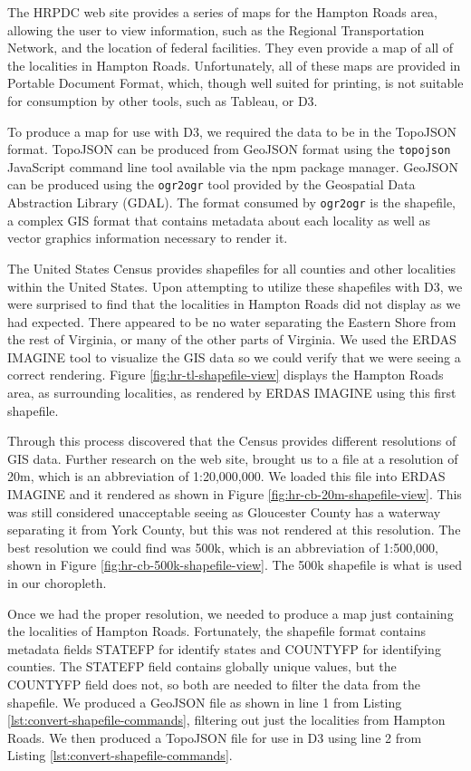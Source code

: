 \documentclass[10pt,journal,compsoc]{IEEEtran}
\begin{document}
The HRPDC web site provides a series of maps for the Hampton Roads area, allowing the user to view information, such as the Regional Transportation Network, and the location of federal facilities.  They even provide a map of all of the localities in Hampton Roads.  Unfortunately, all of these maps are provided in Portable Document Format, which, though well suited for printing, is not suitable for consumption by other tools, such as Tableau, or D3.

To produce a map for use with D3, we required the data to be in the TopoJSON format.  TopoJSON can be produced from GeoJSON format using the {\tt topojson} JavaScript command line tool available via the npm package manager.  GeoJSON can be produced using the {\tt ogr2ogr} tool provided by the Geospatial Data Abstraction Library (GDAL).  The format consumed by {\tt ogr2ogr} is the shapefile, a complex GIS format that contains metadata about each locality as well as vector graphics information necessary to render it.

The United States Census provides shapefiles for all counties and other localities within the United States.  Upon attempting to utilize these shapefiles with D3, we were surprised to find that the localities in Hampton Roads did not display as we had expected.  There appeared to be no water separating the Eastern Shore from the rest of Virginia, or many of the other parts of Virginia.  We used the ERDAS IMAGINE tool to visualize the GIS data so we could verify that we were seeing a correct rendering.  Figure \ref{fig:hr-tl-shapefile-view} displays the Hampton Roads area, as surrounding localities, as rendered by ERDAS IMAGINE using this first shapefile.

Through this process discovered that the Census provides different resolutions of GIS data.  Further research on the web site, brought us to a file at a resolution of 20m, which is an abbreviation of 1:20,000,000.  We loaded this file into ERDAS IMAGINE and it rendered as shown in Figure \ref{fig:hr-cb-20m-shapefile-view}.  This was still considered unacceptable seeing as Gloucester County has a waterway separating it from York County, but this was not rendered at this resolution.  The best resolution we could find was 500k, which is an abbreviation of 1:500,000, shown in Figure \ref{fig:hr-cb-500k-shapefile-view}.  The 500k shapefile is what is used in our choropleth.

Once we had the proper resolution, we needed to produce a map just containing the localities of Hampton Roads.  Fortunately, the shapefile format contains metadata fields STATEFP for identify states and COUNTYFP for identifying counties.  The STATEFP field contains globally unique values, but the COUNTYFP field does not, so both are needed to filter the data from the shapefile.  We produced a GeoJSON file as shown in line 1 from Listing \ref{lst:convert-shapefile-commands}, filtering out just the localities from Hampton Roads.  We then produced a TopoJSON file for use in D3 using line 2 from Listing \ref{lst:convert-shapefile-commands}.
\end{document}
